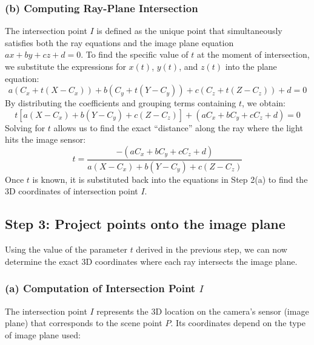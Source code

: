 \documentclass[12pt]{article}
\begin{document}
\subsubsection*{(b) Computing Ray-Plane Intersection}

The intersection point $I$ is defined as the unique point that simultaneously satisfies both the ray equations and the image plane equation $ax + by + cz + d = 0$. To find the specific value of $t$ at the moment of intersection, we substitute the expressions for $x(t)$, $y(t)$, and $z(t)$ into the plane equation:
\begin{equation}
    a(C_x + t(X - C_x)) + b(C_y + t(Y - C_y)) + c(C_z + t(Z - C_z)) + d = 0
\end{equation}
By distributing the coefficients and grouping terms containing $t$, we obtain:
\begin{equation}
    t[a(X - C_x) + b(Y - C_y) + c(Z - C_z)] + (aC_x + bC_y + cC_z + d) = 0
\end{equation}
Solving for $t$ allows us to find the exact ``distance'' along the ray where the light hits the image sensor:
\begin{equation}
    t = \frac{-(aC_x + bC_y + cC_z + d)}{a(X - C_x) + b(Y - C_y) + c(Z - C_z)}
\end{equation}
Once $t$ is known, it is substituted back into the equations in Step 2(a) to find the 3D coordinates of intersection point $I$.

\subsection*{Step 3: Project points onto the image plane}

Using the value of the parameter $t$ derived in the previous step, we can now determine the exact 3D coordinates where each ray intersects the image plane.

\subsubsection*{(a) Computation of Intersection Point $I$}

The intersection point $I$ represents the 3D location on the camera's sensor (image plane) that corresponds to the scene point $P$. Its coordinates depend on the type of image plane used:
\end{document}
